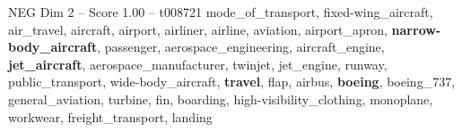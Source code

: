 \begin{textsample}{NEG Dim 2 – Score 1.00 – t008721}  \label{ex:f2_neg_032}
mode\_of\_transport, fixed-wing\_aircraft, air\_travel, aircraft, airport, airliner, airline, aviation, airport\_apron, \textbf{narrow-body\_aircraft}, passenger, aerospace\_engineering, aircraft\_engine, \textbf{jet\_aircraft}, aerospace\_manufacturer, twinjet, jet\_engine, runway, public\_transport, wide-body\_aircraft, \textbf{travel}, flap, airbus, \textbf{boeing}, boeing\_737, general\_aviation, turbine, fin, boarding, high-visibility\_clothing, monoplane, workwear, freight\_transport, landing

\end{textsample}
